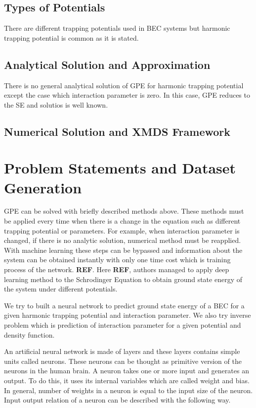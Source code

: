 \documentclass[a4paper,times,12pt]{article}
\begin{document}
\subsection{Types of Potentials}

There are different trapping potentials used in BEC systems but harmonic trapping potential is common as it is stated.


\subsection{Analytical Solution and Approximation}

There is no general analytical solution of GPE for harmonic trapping potential except the case which interaction parameter is zero. In this case, GPE reduces to the SE and solutios is well known.


\subsection{Numerical Solution and XMDS Framework}




\section{Problem Statements and Dataset Generation}

GPE can be solved with briefly described methods above. These methods must be applied every time when there is a change in the equation such as different trapping potential or parameters. For example, when interaction parameter is changed, if there is no analytic solution, numerical method must be reapplied. With machine learning these steps can be bypassed and information about the system can be obtained instantly with only one time cost which is training process of the network. \textbf{REF}. Here \textbf{REF}, authors managed to apply deep learning method to the Schrodinger Equation to obtain ground state energy of the system under different potentials. 

We try to built a neural network to predict ground state energy of a BEC for a given harmonic trapping potential and interaction parameter. We also try inverse problem which is prediction of interaction parameter for a given potential and density function. 


An artificial neural network is made of layers and these layers contains simple units called neurons. These neurons can be thought as primitive version of the neurons in the human brain. A neuron takes one or more input and generates an output. To do this, it uses its internal variables which are called weight and bias. In general, number of weights in a neuron is equal to the input size of the neuron. Input output relation of a neuron can be described with the following way. 
\end{document}
